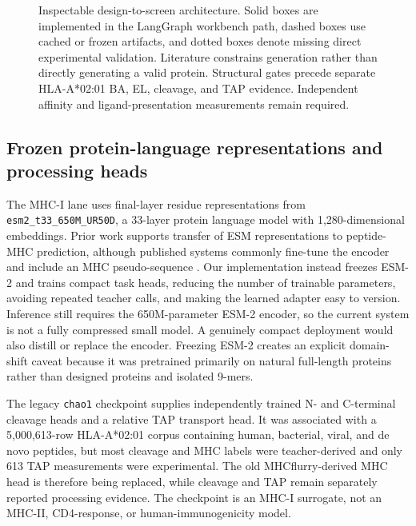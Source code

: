 \documentclass{article}
\begin{document}
\begin{figure}[t]
{%
}
\caption{Inspectable design-to-screen architecture. Solid boxes are implemented in the LangGraph workbench path, dashed boxes use cached or frozen artifacts, and dotted boxes denote missing direct experimental validation. Literature constrains generation rather than directly generating a valid protein. Structural gates precede separate HLA-A*02:01 BA, EL, cleavage, and TAP evidence. Independent affinity and ligand-presentation measurements remain required.}
\label{fig:agent-architecture}
\end{figure}

\subsection{Frozen protein-language representations and processing heads}
The MHC-I lane uses final-layer residue representations from \texttt{esm2\_t33\_650M\_UR50D}, a 33-layer protein language model with 1,280-dimensional embeddings. Prior work supports transfer of ESM representations to peptide-MHC prediction, although published systems commonly fine-tune the encoder and include an MHC pseudo-sequence \cite{hashemi2023plm}. Our implementation instead freezes ESM-2 and trains compact task heads, reducing the number of trainable parameters, avoiding repeated teacher calls, and making the learned adapter easy to version. Inference still requires the 650M-parameter ESM-2 encoder, so the current system is not a fully compressed small model. A genuinely compact deployment would also distill or replace the encoder. Freezing ESM-2 creates an explicit domain-shift caveat because it was pretrained primarily on natural full-length proteins rather than designed proteins and isolated 9-mers.

The legacy \texttt{chao1} checkpoint supplies independently trained N- and C-terminal cleavage heads and a relative TAP transport head. It was associated with a 5,000,613-row HLA-A*02:01 corpus containing human, bacterial, viral, and de novo peptides, but most cleavage and MHC labels were teacher-derived and only 613 TAP measurements were experimental. The old MHCflurry-derived MHC head is therefore being replaced, while cleavage and TAP remain separately reported processing evidence. The checkpoint is an MHC-I surrogate, not an MHC-II, CD4-response, or human-immunogenicity model.
\end{document}
